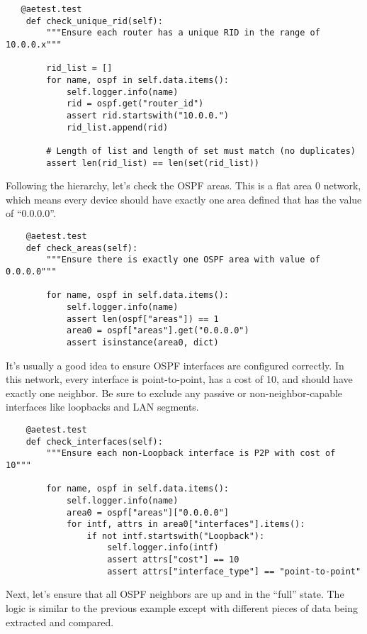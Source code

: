 \begin{verbatim}
   @aetest.test
    def check_unique_rid(self):
        """Ensure each router has a unique RID in the range of 10.0.0.x"""

        rid_list = []
        for name, ospf in self.data.items():
            self.logger.info(name)
            rid = ospf.get("router_id")
            assert rid.startswith("10.0.0.")
            rid_list.append(rid)

        # Length of list and length of set must match (no duplicates)
        assert len(rid_list) == len(set(rid_list))
\end{verbatim}

Following the hierarchy, let's check the OSPF areas. This is a flat area 0
network, which means every device should have exactly one area defined that
has the value of ``0.0.0.0''.

\begin{verbatim}
    @aetest.test
    def check_areas(self):
        """Ensure there is exactly one OSPF area with value of 0.0.0.0"""

        for name, ospf in self.data.items():
            self.logger.info(name)
            assert len(ospf["areas"]) == 1
            area0 = ospf["areas"].get("0.0.0.0")
            assert isinstance(area0, dict)
\end{verbatim}

It's usually a good idea to ensure OSPF interfaces are configured correctly.
In this network, every interface is point-to-point, has a cost of 10, and
should have exactly one neighbor. Be sure to exclude any passive or
non-neighbor-capable interfaces like loopbacks and LAN segments.

\begin{verbatim}
    @aetest.test
    def check_interfaces(self):
        """Ensure each non-Loopback interface is P2P with cost of 10"""

        for name, ospf in self.data.items():
            self.logger.info(name)
            area0 = ospf["areas"]["0.0.0.0"]
            for intf, attrs in area0["interfaces"].items():
                if not intf.startswith("Loopback"):
                    self.logger.info(intf)
                    assert attrs["cost"] == 10
                    assert attrs["interface_type"] == "point-to-point"
\end{verbatim}

Next, let's ensure that all OSPF neighbors are up and in the ``full'' state.
The logic is similar to the previous example except with different pieces of
data being extracted and compared.

